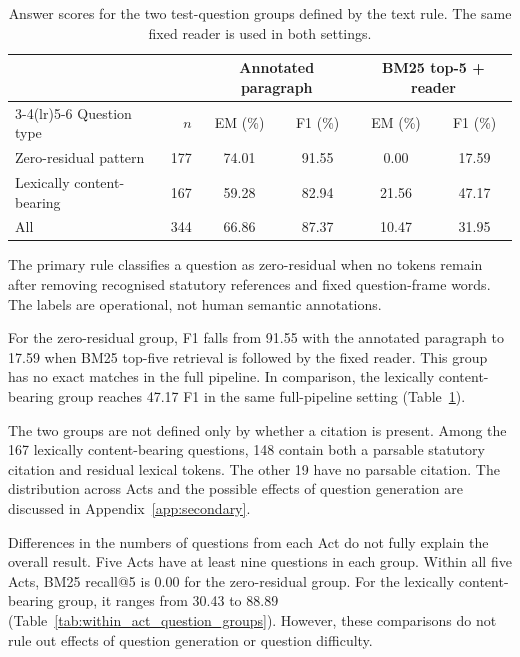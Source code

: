 \documentclass[pdflatex,sn-basic]{sn-jnl}%
\theoremstyle{thmstyleone}%
\theoremstyle{thmstyletwo}%
\theoremstyle{thmstylethree}%
\begin{document}
\begin{table}[!htbp]
    \caption{Answer scores for the two test-question groups defined by the
    text rule. The same fixed reader is used in both settings.}
    \label{tab:citation_specified}
    \centering
    \small
    \setlength{\tabcolsep}{4pt}
    \begin{tabular}{@{}lrcccc@{}}
        \toprule
        & & \multicolumn{2}{c}{Annotated paragraph} &
        \multicolumn{2}{c}{BM25 top-5 + reader} \\
        \cmidrule(lr){3-4}\cmidrule(lr){5-6}
        Question type & $n$ & EM (\%) & F1 (\%) & EM (\%) & F1 (\%) \\
        \midrule
        Zero-residual pattern     & 177 & 74.01 & 91.55 &  0.00 & 17.59 \\
        Lexically content-bearing & 167 & 59.28 & 82.94 & 21.56 & 47.17 \\
        \midrule
        All                       & 344 & 66.86 & 87.37 & 10.47 & 31.95 \\
        \bottomrule
    \end{tabular}
    \begin{flushleft}
        {\scriptsize The primary rule classifies a question as zero-residual
        when no tokens remain after removing recognised statutory references
        and fixed question-frame words. The labels are operational, not human
        semantic annotations.}
    \end{flushleft}
\end{table}

For the zero-residual group, F1 falls from 91.55 with the annotated paragraph
to 17.59 when BM25 top-five retrieval is followed by the fixed reader. This
group has no exact matches in the full pipeline. In comparison, the
lexically content-bearing group reaches 47.17 F1 in the same full-pipeline
setting (Table~\ref{tab:citation_specified}).

The two groups are not defined only by whether a citation is present. Among
the 167 lexically content-bearing questions, 148 contain both a parsable
statutory citation and residual lexical tokens. The other 19 have no parsable
citation. The distribution across Acts and the possible effects of question
generation are discussed in Appendix~\ref{app:secondary}.

Differences in the numbers of questions from each Act do not fully explain
the overall result. Five Acts have at least nine questions in each group.
Within all five Acts, BM25 recall@5 is 0.00 for the zero-residual group. For
the lexically content-bearing group, it ranges from 30.43 to 88.89
(Table~\ref{tab:within_act_question_groups}). However, these comparisons do
not rule out effects of question generation or question difficulty.
\end{document}
